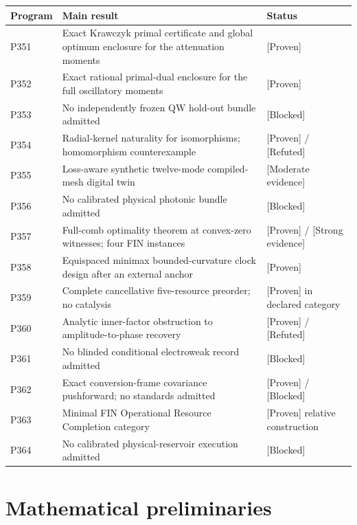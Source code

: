 \documentclass[11pt,a4paper,openany]{report}
\newcommand{\statusProven}{\textcolor{fingreen}{[Proven]}}
\newcommand{\statusStrong}{\textcolor{finblue}{[Strong evidence]}}
\newcommand{\statusModerate}{\textcolor{finviolet}{[Moderate evidence]}}
\newcommand{\statusRefuted}{\textcolor{finred}{[Refuted]}}
\begin{document}
\begin{center}
\begingroup\small
\setlength{\tabcolsep}{2.5pt}
\renewcommand{\arraystretch}{1.16}
\begin{longtable}{@{}p{}p{}p{}@{}}
\toprule
\textbf{Program} & \textbf{Main result} & \textbf{Status} \\
\midrule
\endhead
P351 & Exact Krawczyk primal certificate and global optimum enclosure for the attenuation moments & \statusProven{} \\
P352 & Exact rational primal-dual enclosure for the full oscillatory moments & \statusProven{} \\
P353 & No independently frozen QW hold-out bundle admitted & [Blocked] \\
P354 & Radial-kernel naturality for isomorphisms; homomorphism counterexample & \statusProven{} /\allowbreak{} \statusRefuted{} \\
P355 & Loss-aware synthetic twelve-mode compiled-mesh digital twin & \statusModerate{} \\
P356 & No calibrated physical photonic bundle admitted & [Blocked] \\
P357 & Full-comb optimality theorem at convex-zero witnesses; four FIN instances & \statusProven{} /\allowbreak{} \statusStrong{} \\
P358 & Equispaced minimax bounded-curvature clock design after an external anchor & \statusProven{} \\
P359 & Complete cancellative five-resource preorder; no catalysis & \statusProven{} in declared category \\
P360 & Analytic inner-factor obstruction to amplitude-to-phase recovery & \statusProven{} /\allowbreak{} \statusRefuted{} \\
P361 & No blinded conditional electroweak record admitted & [Blocked] \\
P362 & Exact conversion-frame covariance pushforward; no standards admitted & \statusProven{} /\allowbreak{} [Blocked] \\
P363 & Minimal FIN Operational Resource Completion category & \statusProven{} relative construction \\
P364 & No calibrated physical-reservoir execution admitted & [Blocked] \\
\bottomrule
\end{longtable}
\endgroup
\end{center}

\chapter{Mathematical preliminaries}
\end{document}
